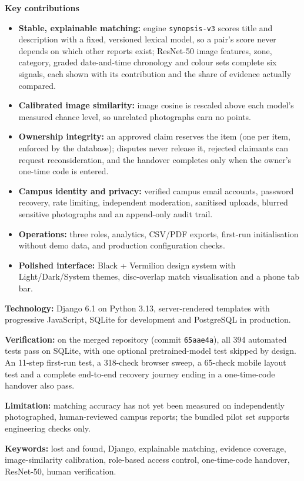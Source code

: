 \documentclass[12pt,a4paper,oneside]{report}
\newcommand{\code}[1]{\texttt{#1}}
\begin{document}
\textbf{Key contributions}
\begin{itemize}
  \item \textbf{Stable, explainable matching:} engine \code{synopsis-v3} scores title and description with a fixed, versioned lexical model, so a pair's score never depends on which other reports exist; ResNet-50 image features, zone, category, graded date-and-time chronology and colour sets complete six signals, each shown with its contribution and the share of evidence actually compared.
  \item \textbf{Calibrated image similarity:} image cosine is rescaled above each model's measured chance level, so unrelated photographs earn no points.
  \item \textbf{Ownership integrity:} an approved claim reserves the item (one per item, enforced by the database); disputes never release it, rejected claimants can request reconsideration, and the handover completes only when the owner's one-time code is entered.
  \item \textbf{Campus identity and privacy:} verified campus email accounts, password recovery, rate limiting, independent moderation, sanitised uploads, blurred sensitive photographs and an append-only audit trail.
  \item \textbf{Operations:} three roles, analytics, CSV/PDF exports, first-run initialisation without demo data, and production configuration checks.
  \item \textbf{Polished interface:} Black + Vermilion design system with Light/Dark/System themes, disc-overlap match visualisation and a phone tab bar.
\end{itemize}

\textbf{Technology:} Django 6.1 on Python 3.13, server-rendered templates with progressive JavaScript, SQLite for development and PostgreSQL in production.

\textbf{Verification:} on the merged repository (commit \code{65aae4a}), all 394 automated tests pass on SQLite, with one optional pretrained-model test skipped by design. An 11-step first-run test, a 318-check browser sweep, a 65-check mobile layout test and a complete end-to-end recovery journey ending in a one-time-code handover also pass.

\textbf{Limitation:} matching accuracy has not yet been measured on independently photographed, human-reviewed campus reports; the bundled pilot set supports engineering checks only.

\textbf{Keywords:} lost and found, Django, explainable matching, evidence coverage, image-similarity calibration, role-based access control, one-time-code handover, ResNet-50, human verification.
\end{document}
